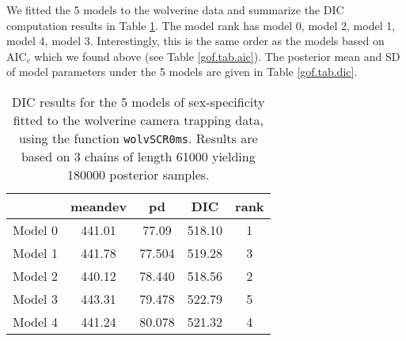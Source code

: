 {We fitted the 5 models to the wolverine data and summarize
the DIC computation results in Table \ref{gof.tab.DIC}. 
The model rank has model 0, model 2, model 1, model 4, model 3.
Interestingly, this is the same order as the models based on AIC$_c$
which we found above
(see Table \ref{gof.tab.aic}).
The posterior mean and SD of model parameters under the 5 models are
given in Table \ref{gof.tab.dic}. 

\begin{table}[ht]
\centering
\caption{
DIC results for the 5 models of sex-specificity fitted to the
wolverine camera trapping data, using the function
\mbox{\tt wolvSCR0ms}. Results are based on 3 chains of length 61000
yielding 180000 posterior samples. 
}
\begin{tabular}{ccccc} \hline \hline
      &  meandev  &  pd   &    DIC  &   rank \\ \hline
Model 0&  441.01 & 77.09&518.10&    1 \\
Model 1& 441.78 &77.504 &519.28&    3\\
Model 2& 440.12 &78.440 &518.56&    2\\
Model 3& 443.31 &79.478 &522.79&    5\\
Model 4& 441.24 &80.078 &521.32&    4\\
\end{tabular}
\label{gof.tab.DIC}
\end{table}

\begin{comment}
\begin{verbatim}
DIC info (using the rule, pD = var(deviance)/2)
pD = 80.1 and DIC = 521.3
DIC is an estimate of expected predictive error (lower deviance is better).
            mean    sd   mean    sd   mean    sd   mean    sd   mean    sd
D           5.79  1.15   5.81  1.15   5.72  1.15   5.75  1.15   5.66  1.13
N          60.02 11.91  60.24 11.93  59.37 11.97  59.67 11.97  58.77 11.75
alpha0     -2.81  0.18  -2.82  0.17  -2.44  0.25  -2.82  0.18  -2.43  0.25
alpha.sex   0.00  1.73   0.00  1.73  -0.75  0.34   0.00  1.73  -0.79  0.36
%%beta        1.25  0.21   1.26  0.21   1.19  0.21   1.24  0.29   1.30  0.32
beta.sex    0.00  1.73  -0.01  1.73   0.01  1.74  -0.01  0.17   0.10  0.18
sigma0       0.64  0.06   0.64  0.05   0.66  0.06   0.65  0.08   0.63  0.09
psi         0.30  0.07   0.30  0.07   0.30  0.07   0.30  0.07   0.30  0.07
psi.sex     0.50  0.29   0.52  0.10   0.56  0.10   0.52  0.11   0.54  0.11
deviance  441.01 12.42 441.78 12.45 440.12 12.53 443.31 12.61 441.24 12.66
\end{verbatim}
\end{comment}

}
